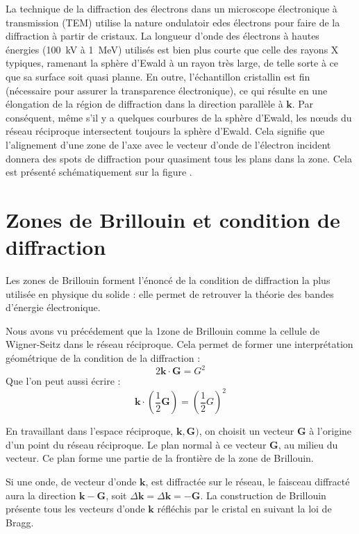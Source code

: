 La technique de la diffraction des électrons dans un microscope électronique à
transmission (TEM) utilise la nature ondulatoir edes électrons pour faire de la
diffraction à partir de cristaux. La longueur d'onde des électrons à hautes
énergies (\SI{100}{\kilo\volt} à \SI{1}{\mega\electronvolt}) utilisés est bien
plus courte que celle des rayons X typiques, ramenant la sphère d'Ewald à un
rayon très large, de telle sorte à ce que sa surface soit quasi planne.
En outre, l'échantillon cristallin est fin (nécessaire pour assurer la
transparence électronique), ce qui résulte en une élongation de la région de
diffraction dans la direction parallèle à $\mathbf{k}$.
Par conséquent, même s'il y a quelques courbures de la sphère d'Ewald, les nœuds
du réseau réciproque intersectent toujours la sphère d'Ewald. Cela signifie que
l'alignement d'une zone de l'axe avec le vecteur d'onde de l'électron
incident donnera des spots de diffraction pour quasiment tous les plans dans la
zone. Cela est présenté schématiquement sur la figure \TODO.



\section{Zones de Brillouin et condition de diffraction}

Les zones de Brillouin forment l'énoncé de la condition de diffraction la plus
utilisée en physique du solide : elle permet de retrouver la théorie des bandes
d'énergie électronique.

Nous avons vu précédement que la 1\iere zone de Brillouin comme la cellule de
Wigner-Seitz dans le réseau réciproque. Cela permet de former une interprétation
géométrique de la condition de la diffraction :
\begin{equation}
    2\mathbf{k} \cdot \mathbf{G} = G^2
\end{equation}
Que l'on peut aussi écrire :
\begin{equation}
    \mathbf{k} \cdot \left( \frac{1}{2} \mathbf{G} \right) = \left( \frac{1}{2} G \right)^2
\end{equation}

En travaillant dans l'espace réciproque, $\mathbf{k},\mathbf{G})$, on choisit un
vecteur $\mathbf{G}$ à l'origine d'un point du réseau réciproque. Le plan normal
à ce vecteur $\mathbf{G}$, au milieu du vecteur. Ce plan forme une partie de la
frontière de la zone de Brillouin.

Si une onde, de vecteur d'onde $\mathbf{k}$, est diffractée sur le réseau, le
faisceau diffracté aura la direction $\mathbf{k}-\mathbf{G}$, soit $\Delta\mathbf{k} = \Delta\mathbf{k} = -\mathbf{G}$.
La construction de Brillouin présente tous les vecteurs d'onde $\mathbf{k}$
réfléchis par le cristal en suivant la loi de Bragg.

